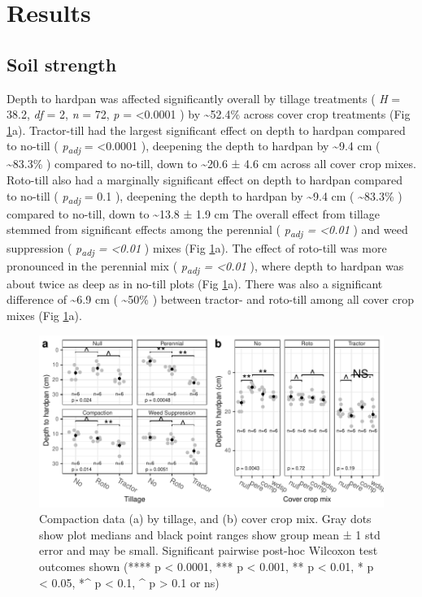 \documentclass[
  12pt,
]{article}
\begin{document}
\hypertarget{results}{%
\section{Results}\label{results}}

\hypertarget{soil-strength}{%
\subsection{Soil strength}\label{soil-strength}}

Depth to hardpan was affected significantly overall by tillage treatments (
\emph{H} = 38.2,
\emph{df} = 2,
\emph{n} = 72,
\emph{p} = \textless0.0001
) by
\textasciitilde52.4\%
across cover crop treatments (Fig \ref{fig:compactFig}a).
Tractor-till had the largest significant effect on depth to hardpan compared to no-till (
\emph{p\textsubscript{adj}} = \textless0.0001
),
deepening the depth to hardpan by
\textasciitilde9.4 cm (
\textasciitilde83.3\%
) compared to no-till,
down to
\textasciitilde20.6 ±
4.6 cm
across all cover crop mixes.
Roto-till also had a marginally significant effect on depth to hardpan compared to no-till (
\emph{p\textsubscript{adj}} = 0.1
),
deepening the depth to hardpan by
\textasciitilde9.4 cm (
\textasciitilde83.3\%
) compared to no-till, down to
\textasciitilde13.8 ±
1.9 cm
The overall effect from tillage stemmed from significant effects among the perennial (
\emph{p\textsubscript{adj} = \textless0.01}
) and weed suppression (
\emph{p\textsubscript{adj} = \textless0.01}
) mixes (Fig \ref{fig:compactFig}a).
The effect of roto-till was more pronounced in the perennial mix (
\emph{p\textsubscript{adj} = \textless0.01}
), where depth to hardpan was about twice as deep as in no-till plots (Fig \ref{fig:compactFig}a).
There was also a significant difference of
\textasciitilde6.9 cm (
\textasciitilde50\%
) between tractor- and roto-till among all cover crop mixes (Fig \ref{fig:compactFig}a).

\begin{figure}
\centering
\includegraphics{merge_files/figure-latex/compactFig-1.pdf}
\caption{\label{fig:compactFig}Compaction data (a) by tillage, and (b) cover crop mix. Gray dots show plot medians and black point ranges show group mean ± 1 std error and may be small. Significant pairwise post-hoc Wilcoxon test outcomes shown (**** p \textless{} 0.0001, *** p \textless{} 0.001, ** p \textless{} 0.01, * p \textless{} 0.05, *\^{} p \textless{} 0.1, \^{} p \textgreater{} 0.1 or ns)}
\end{figure}
\end{document}
